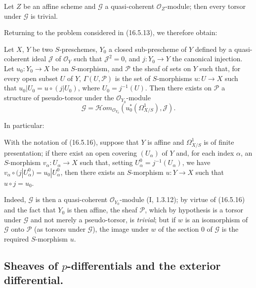 \begin{proposition}[16.5.16]
\label{IV.16.5.16}
Let $Z$ be an affine scheme and $\mathscr{G}$ a quasi-coherent
$\mathcal{O}_Z$-module; then every torsor under $\mathscr{G}$ is trivial.
\end{proposition}

Returning to the problem considered in (16.5.13), we therefore obtain:

\begin{proposition}[16.5.17]
\label{IV.16.5.17}
Let $X$, $Y$ be two $S$-preschemes, $Y_0$ a closed sub-prescheme of $Y$
defined by a quasi-coherent ideal $\mathscr{J}$ of $\mathcal{O}_Y$ such that
$\mathscr{J}^2=0$, and $j:Y_0\to Y$ the canonical injection. Let
$u_0:Y_0\to X$ be an $S$-morphism, and $\mathscr{P}$ the sheaf of sets on
$Y$ such that, for every open subset $U$ of $Y$, $\Gamma(U,\mathscr{P})$ is
the set of $S$-morphisms $u:U\to X$ such that
$u_0|U_0=u\circ(j|U_0)$, where $U_0=j^{-1}(U)$. Then there exists on
$\mathscr{P}$ a structure of pseudo-torsor under the
$\mathcal{O}_{Y_0}$-module
\[
  \mathscr{G}=\mathscr{H}om_{\mathcal{O}_{Y_0}}
  (u_0^*(\Omega_{X/S}^1),\mathscr{J}).
\]
\end{proposition}

In particular:

\begin{corollary}[16.5.18]
\label{IV.16.5.18}
With the notation of (16.5.16), suppose that $Y$ is affine and $\Omega_{X/S}^1$
is of finite presentation; if there exist an open covering $(U_\alpha)$ of $Y$
and, for each index $\alpha$, an $S$-morphism $v_\alpha:U_\alpha\to X$
such that, setting $U_\alpha^0=j^{-1}(U_\alpha)$, we have
$v_\alpha\circ(j|U_\alpha^0)=u_0|U_\alpha^0$, then there exists an
$S$-morphism $u:Y\to X$ such that $u\circ j=u_0$.
\end{corollary}

Indeed, $\mathscr{G}$ is then a quasi-coherent
$\mathcal{O}_{Y_0}$-module (I, 1.3.12); by virtue of (16.5.16) and the fact that
$Y_0$ is then affine, the sheaf $\mathscr{P}$, which by hypothesis is a torsor
under $\mathscr{G}$ and not merely a pseudo-torsor, is \emph{trivial}; but if
$w$ is an isomorphism of $\mathscr{G}$ onto $\mathscr{P}$ (as
torsors under $\mathscr{G}$), the image under $w$ of the section 0 of
$\mathscr{G}$ is the required $S$-morphism $u$.

\subsection{\texorpdfstring{Sheaves of $p$-differentials and the exterior differential.}{Sheaves of p-differentials and the exterior differential.}}


